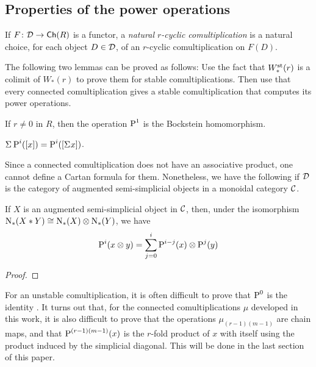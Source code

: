 \subsection{Properties of the power operations}
If $F\colon \mathcal{D}\to \mathsf{Ch}(R)$ is a functor, a \emph{natural $r$-cyclic comultiplication} is a natural choice, for each object $D\in \mathcal{D}$, of an $r$-cyclic comultiplication on $F(D)$.

The following two lemmas can be proved as follows: Use the fact that $W^{\mathrm{st}}_*(r)$ is a colimit of $W_*(r)$ to prove them for stable comultiplications. Then use that every connected comultiplication gives a stable comultiplication that computes its power operations.
\begin{lemma}
	If $r\neq 0$ in $R$, then the operation $\operatorname{P}^1$ is the Bockstein homomorphism.
\end{lemma}
\begin{lemma}
	$\Sigma^{} \operatorname{P}^i([x]) = \operatorname{P}^i([\Sigma^{} x])$.
\end{lemma}
Since a connected comultiplication does not have an associative product, one cannot define a Cartan formula for them. Nonetheless, we have the following if $\mathcal{D}$ is the category of augmented semi-simplicial objects in a monoidal category $\mathcal{C}$.
\begin{lemma}
	If $X$ is an augmented semi-simplicial object in $\mathcal{C}$, then, under the isomorphism $\operatorname{N}_*(X*Y)\cong \operatorname{N}_*(X)\otimes\operatorname{N}_*(Y)$, we have
	\[
	\operatorname{P}^i(x\otimes y) = \sum_{j=0}^{i} \operatorname{P}^{i-j}(x)\otimes \operatorname{P}^j(y)
	\]
\end{lemma}

\begin{proof} 
\end{proof}

For an unstable comultiplication, it is often difficult to prove that $\operatorname{P}^0$ is the identity \cite{may1970general}. It turns out that, for the connected comultiplications $\mu$ developed in this work, it is also difficult to prove that the operations $\mu_{(r-1)(m-1)}$ are chain maps, and that $\operatorname{P}^{(r-1)(m-1)}(x)$ is the $r$-fold product of $x$ with itself using the product induced by the simplicial diagonal. This will be done in the last section of this paper.

